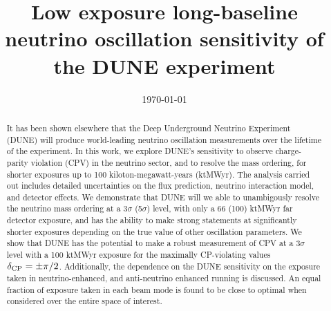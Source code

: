 \documentclass[aps,prd,twocolumn,showpacs,superscriptaddress,nofootinbib,floatfix,letterpaper]{revtex4-1}
\newcommand{\deltacp}{\ensuremath{\delta_{\rm CP}}\xspace}   %
\begin{document}
\title{Low exposure long-baseline neutrino oscillation sensitivity of the DUNE experiment}
\date{\today}
\noaffiliation
% 
\linenumbers
\begin{abstract}
It has been shown elsewhere that the Deep Underground Neutrino Experiment (DUNE) will produce world-leading neutrino oscillation measurements over the lifetime of the experiment. In this work, we explore DUNE's sensitivity to observe charge-parity violation (CPV) in the neutrino sector, and to resolve the mass ordering, for shorter exposures up to 100 kiloton-megawatt-years (ktMWyr). The analysis carried out includes detailed uncertainties on the flux prediction, neutrino interaction model, and detector effects. We demonstrate that DUNE will we able to unambigously resolve the neutrino mass ordering at a 3$\sigma$ (5$\sigma$) level, with only a 66 (100) ktMWyr far detector exposure, and has the ability to make strong statements at significantly shorter exposures depending on the true value of other oscillation parameters. We show that DUNE has the potential to make a robust measurement of CPV at a 3$\sigma$ level with a 100 ktMWyr exposure for the maximally CP-violating values $\deltacp = \pm\pi/2$. Additionally, the dependence on the DUNE sensitivity on the exposure taken in neutrino-enhanced, and anti-neutrino enhanced running is discussed. An equal fraction of exposure taken in each beam mode is found to be close to optimal when considered over the entire space of interest.
\end{abstract}

\maketitle











\appendix*

\end{document}
